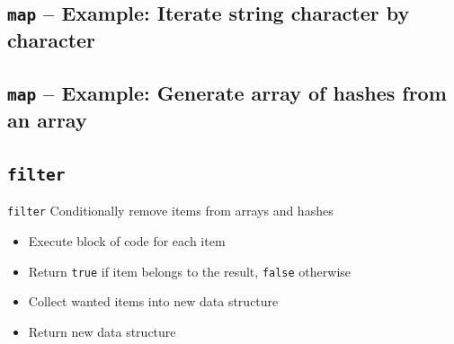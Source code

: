 \documentclass[english,aspectratio=43,nohandout]{beamer}
\begin{document}
\subsection{\texttt{map} -- Example: Iterate string character by character}
\begin{frame}{\insertsection}{\insertsubsection}
\pause
\pause

\end{frame}

\subsection{\texttt{map} -- Example: Generate array of hashes from an array}
\begin{frame}{\insertsection}{\insertsubsection}

\end{frame}

\begin{frame}{\insertsection}{\insertsubsection}

\end{frame}

\subsection{\texttt{filter}}
\begin{frame}{\insertsection}{\insertsubsection}

\begin{block}{\texttt{filter}}
Conditionally remove items from arrays and hashes
\end{block}

\vspace{\baselineskip}\pause

\begin{itemize}
\item Execute block of code for each item
\item Return \texttt{true} if item belongs to the result,
  \texttt{false} otherwise
\item Collect wanted items into new data structure
\item Return new data structure
\end{itemize}
\end{frame}
\end{document}
